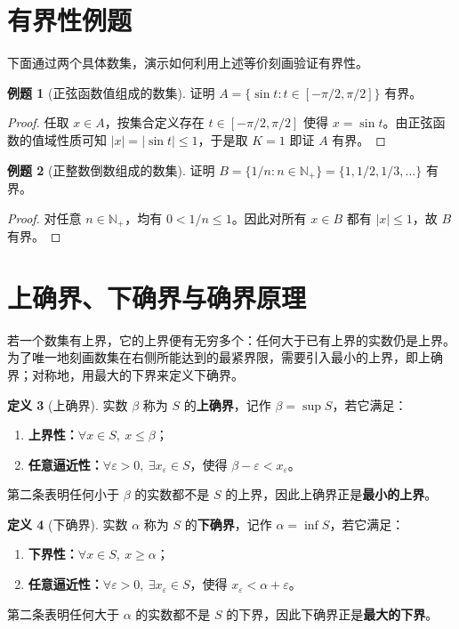 \documentclass[UTF8, fontset=fandol, a4paper, 12pt]{ctexart}
\newcommand{\Nplus}{\mathbb{N}_{+}}
\theoremstyle{definition}
\newtheorem{definition}{定义}[section]
\newtheorem{example}[definition]{例题}
\begin{document}
\section{有界性例题}
下面通过两个具体数集，演示如何利用上述等价刻画验证有界性。

\begin{example}[正弦函数值组成的数集]
证明 $A=\{\sin t:t\in[-\pi/2,\pi/2]\}$ 有界。
\end{example}
\begin{proof}
任取 $x\in A$，按集合定义存在 $t\in[-\pi/2,\pi/2]$ 使得 $x=\sin t$。由正弦函数的值域性质可知 $|x|=|\sin t|\le1$，于是取 $K=1$ 即证 $A$ 有界。
\end{proof}

\begin{example}[正整数倒数组成的数集]
证明 $B=\{1/n:n\in\Nplus\}=\{1,1/2,1/3,\ldots\}$ 有界。
\end{example}
\begin{proof}
对任意 $n\in\Nplus$，均有 $0<1/n\le1$。因此对所有 $x\in B$ 都有 $|x|\le1$，故 $B$ 有界。
\end{proof}

\section{上确界、下确界与确界原理}
若一个数集有上界，它的上界便有无穷多个：任何大于已有上界的实数仍是上界。为了唯一地刻画数集在右侧所能达到的最紧界限，需要引入最小的上界，即上确界；对称地，用最大的下界来定义下确界。

\begin{definition}[上确界]
实数 $\beta$ 称为 $S$ 的\textbf{上确界}，记作 $\beta=\sup S$，若它满足：
\begin{enumerate}
  \item \textbf{上界性：}$\forall x\in S,\ x\le\beta$；
  \item \textbf{任意逼近性：}$\forall\varepsilon>0,\ \exists x_{\varepsilon}\in S$，使得
  $\beta-\varepsilon<x_{\varepsilon}$。
\end{enumerate}
第二条表明任何小于 $\beta$ 的实数都不是 $S$ 的上界，因此上确界正是\textbf{最小的上界}。
\end{definition}

\begin{definition}[下确界]
实数 $\alpha$ 称为 $S$ 的\textbf{下确界}，记作 $\alpha=\inf S$，若它满足：
\begin{enumerate}
  \item \textbf{下界性：}$\forall x\in S,\ x\ge\alpha$；
  \item \textbf{任意逼近性：}$\forall\varepsilon>0,\ \exists x_{\varepsilon}\in S$，使得
  $x_{\varepsilon}<\alpha+\varepsilon$。
\end{enumerate}
第二条表明任何大于 $\alpha$ 的实数都不是 $S$ 的下界，因此下确界正是\textbf{最大的下界}。
\end{definition}
\end{document}
